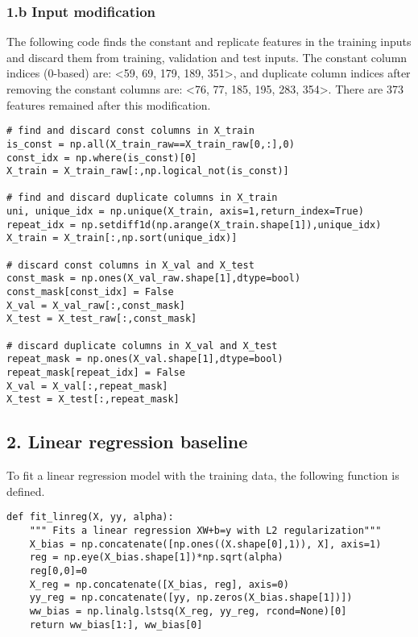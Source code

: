 \documentclass[11pt]{article}
\begin{document}
\hypertarget{b-input-modification}{%
\subsubsection{1.b Input modification}\label{b-input-modification}}

The following code finds the constant and replicate features in the
training inputs and discard them from training, validation and test
inputs. The constant column indices (0-based) are: \textless{}59, 69,
179, 189, 351\textgreater{}, and duplicate column indices after removing
the constant columns are: \textless{}76, 77, 185, 195, 283,
354\textgreater{}. There are 373 features remained after this
modification.

\begin{verbatim}
# find and discard const columns in X_train
is_const = np.all(X_train_raw==X_train_raw[0,:],0)
const_idx = np.where(is_const)[0]
X_train = X_train_raw[:,np.logical_not(is_const)]

# find and discard duplicate columns in X_train
uni, unique_idx = np.unique(X_train, axis=1,return_index=True)
repeat_idx = np.setdiff1d(np.arange(X_train.shape[1]),unique_idx)
X_train = X_train[:,np.sort(unique_idx)]

# discard const columns in X_val and X_test
const_mask = np.ones(X_val_raw.shape[1],dtype=bool)
const_mask[const_idx] = False
X_val = X_val_raw[:,const_mask]
X_test = X_test_raw[:,const_mask]

# discard duplicate columns in X_val and X_test
repeat_mask = np.ones(X_val.shape[1],dtype=bool)
repeat_mask[repeat_idx] = False
X_val = X_val[:,repeat_mask]
X_test = X_test[:,repeat_mask]
\end{verbatim}

\hypertarget{linear-regression-baseline}{%
\subsection{2. Linear regression
baseline}\label{linear-regression-baseline}}

To fit a linear regression model with the training data, the following
function is defined.

\begin{verbatim}
def fit_linreg(X, yy, alpha):
    """ Fits a linear regression XW+b=y with L2 regularization"""
    X_bias = np.concatenate([np.ones((X.shape[0],1)), X], axis=1)
    reg = np.eye(X_bias.shape[1])*np.sqrt(alpha)
    reg[0,0]=0
    X_reg = np.concatenate([X_bias, reg], axis=0)
    yy_reg = np.concatenate([yy, np.zeros(X_bias.shape[1])])
    ww_bias = np.linalg.lstsq(X_reg, yy_reg, rcond=None)[0]
    return ww_bias[1:], ww_bias[0]
\end{verbatim}
\end{document}
